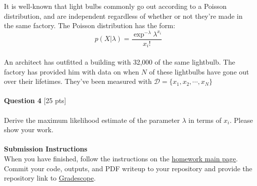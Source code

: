 \documentclass[paper=a4, fontsize=11pt]{scrartcl} %
\begin{document}



%

It is well-known that light bulbs commonly go out according to a Poisson distribution, and are independent regardless of whether or not they're made in the same factory. The Poisson distribution has the form: \\
\begin{equation}
p(X | \lambda) = \frac{ \exp^{-\lambda} \lambda ^{x_i}}{ x_i !} \nonumber
\end{equation} \\

An architect has outfitted a building with 32,000 of the same lightbulb. The factory has provided him with data on when $N$ of these lightbulbs have gone out over their lifetimes. They've been measured with $\mathcal{D} = \{ x_1, x_2, \cdots, x_N \}$\\
\\
{\Large \textbf{Question 4} [25 pts]} \\
\\
Derive the maximum likelihood estimate of the parameter $\lambda$ in terms of $x_i$. Please show your work. \\
\\


{\huge \textbf{Submission Instructions}} \\

When you have finished, follow the instructions on the \href{https://course.ccs.neu.edu/cs6220/homework-3/}{ homework main page}. Commit your code, outputs, and PDF writeup to your repository and provide the repository link to \href{https://www.gradescope.com}{Gradescope}.
\end{document}

